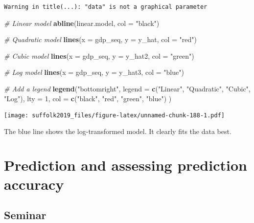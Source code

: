 \documentclass[]{article}
\newenvironment{Shaded}{\begin{snugshade}}{\end{snugshade}}
\newcommand{\CommentTok}[1]{\textcolor[rgb]{0.56,0.35,0.01}{\textit{#1}}}
\newcommand{\DataTypeTok}[1]{\textcolor[rgb]{0.13,0.29,0.53}{#1}}
\newcommand{\DecValTok}[1]{\textcolor[rgb]{0.00,0.00,0.81}{#1}}
\newcommand{\KeywordTok}[1]{\textcolor[rgb]{0.13,0.29,0.53}{\textbf{#1}}}
\newcommand{\NormalTok}[1]{#1}
\newcommand{\StringTok}[1]{\textcolor[rgb]{0.31,0.60,0.02}{#1}}
\begin{document}
\begin{verbatim}
Warning in title(...): "data" is not a graphical parameter
\end{verbatim}

\begin{Shaded}
\begin{Highlighting}[]
\CommentTok{# Linear model}
\KeywordTok{abline}\NormalTok{(linear.model, }\DataTypeTok{col =} \StringTok{"black"}\NormalTok{)}

\CommentTok{# Quadratic model}
\KeywordTok{lines}\NormalTok{(}\DataTypeTok{x =}\NormalTok{ gdp_seq, }\DataTypeTok{y =}\NormalTok{ y_hat, }\DataTypeTok{col =} \StringTok{"red"}\NormalTok{)}

\CommentTok{# Cubic model}
\KeywordTok{lines}\NormalTok{(}\DataTypeTok{x =}\NormalTok{ gdp_seq, }\DataTypeTok{y =}\NormalTok{ y_hat2, }\DataTypeTok{col =} \StringTok{"green"}\NormalTok{)}

\CommentTok{# Log model}
\KeywordTok{lines}\NormalTok{(}\DataTypeTok{x =}\NormalTok{ gdp_seq, }\DataTypeTok{y =}\NormalTok{ y_hat3, }\DataTypeTok{col =} \StringTok{"blue"}\NormalTok{)}

\CommentTok{# Add a legend}
\KeywordTok{legend}\NormalTok{(}\StringTok{"bottomright"}\NormalTok{, }
       \DataTypeTok{legend =} \KeywordTok{c}\NormalTok{(}\StringTok{"Linear"}\NormalTok{, }\StringTok{"Quadratic"}\NormalTok{, }\StringTok{"Cubic"}\NormalTok{, }\StringTok{"Log"}\NormalTok{), }
       \DataTypeTok{lty =} \DecValTok{1}\NormalTok{, }
       \DataTypeTok{col =} \KeywordTok{c}\NormalTok{(}\StringTok{"black"}\NormalTok{, }\StringTok{"red"}\NormalTok{, }\StringTok{"green"}\NormalTok{, }\StringTok{"blue"}\NormalTok{) }
\NormalTok{)}
\end{Highlighting}
\end{Shaded}

\texttt{[image: suffolk2019\_files/figure-latex/unnamed-chunk-188-1.pdf]}

The blue line shows the log-transformed model. It clearly fits the data best.

\hypertarget{prediction-and-assessing-prediction-accuracy}{%
\section{Prediction and assessing prediction accuracy}\label{prediction-and-assessing-prediction-accuracy}}

\hypertarget{seminar-8}{%
\subsection{Seminar}\label{seminar-8}}
\end{document}
